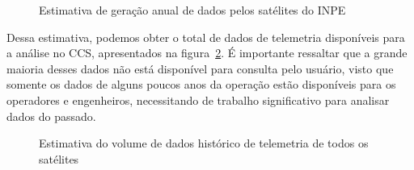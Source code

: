 \begin{figure}[!htb]
	\caption{Estimativa de geração anual de dados pelos satélites do INPE}\label{fig:datagenest}
	\vspace{4mm}
	\begin{center}
	\end{center}
	\vspace{2mm}
	\legenda{}
\end{figure}

Dessa estimativa, podemos obter o total de dados de telemetria disponíveis para a análise no CCS, apresentados na figura~\ref{fig:totaldatagen}.
É importante ressaltar que a grande maioria desses dados não está disponível para consulta pelo usuário, visto que somente os dados de alguns poucos anos da operação estão disponíveis para os operadores e engenheiros, necessitando de trabalho significativo para analisar dados do passado.

\begin{figure}[!htb]
	\caption{Estimativa do volume de dados histórico de telemetria de todos os satélites}\label{fig:totaldatagen}
	\vspace{4mm}
	\begin{center}
	\end{center}
	\vspace{2mm}
	\legenda{}
\end{figure}

